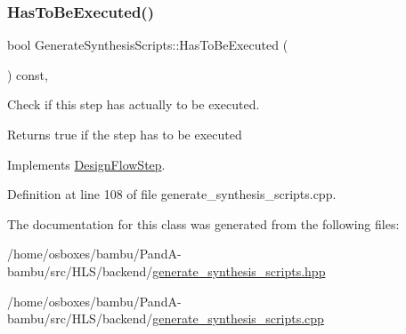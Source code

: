 \subsubsection{\texorpdfstring{Has\+To\+Be\+Executed()}{HasToBeExecuted()}}
{\footnotesize\ttfamily bool Generate\+Synthesis\+Scripts\+::\+Has\+To\+Be\+Executed (\begin{DoxyParamCaption}{ }\end{DoxyParamCaption}) const\hspace{0.3cm}{\ttfamily [override]}, {\ttfamily [virtual]}}



Check if this step has actually to be executed. 

\begin{DoxyReturn}{Returns}
true if the step has to be executed 
\end{DoxyReturn}


Implements \hyperlink{classDesignFlowStep_a1783abe0c1d162a52da1e413d5d1ef05}{Design\+Flow\+Step}.



Definition at line 108 of file generate\+\_\+synthesis\+\_\+scripts.\+cpp.



The documentation for this class was generated from the following files\+:\begin{DoxyCompactItemize}
\item 
/home/osboxes/bambu/\+Pand\+A-\/bambu/src/\+H\+L\+S/backend/\hyperlink{generate__synthesis__scripts_8hpp}{generate\+\_\+synthesis\+\_\+scripts.\+hpp}\item 
/home/osboxes/bambu/\+Pand\+A-\/bambu/src/\+H\+L\+S/backend/\hyperlink{generate__synthesis__scripts_8cpp}{generate\+\_\+synthesis\+\_\+scripts.\+cpp}\end{DoxyCompactItemize}
